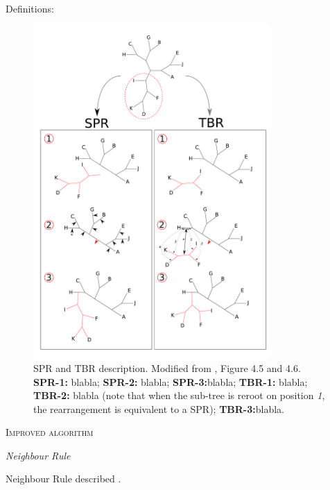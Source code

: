 \documentclass[12pt,letterpaper]{article}
\renewcommand{\section}[1]{%
\bigskip
\begin{center}
\begin{Large}
\normalfont\scshape #1
\medskip
\end{Large}
\end{center}}
\renewcommand{\subsection}[1]{%
\bigskip
\begin{center}
\begin{large}
\normalfont\itshape #1
\end{large}
\end{center}}
\begin{document}
Definitions: \cite{allen2001subtree,felsenstein2004inferring}


\begin{figure}[!htbp]
\centering
   \includegraphics[width=0.8\textwidth]{Figure/FelsensteinFigure.pdf}
\caption{\scriptsize{SPR and TBR description. Modified from \cite{felsenstein2004inferring}, Figure 4.5 and 4.6. \textbf{SPR-1:} blabla; \textbf{SPR-2:} blabla; \textbf{SPR-3:}blabla; \textbf{TBR-1:} blabla; \textbf{TBR-2:} blabla (note that when the sub-tree is reroot on position \textit{1}, the rearrangement is equivalent to a SPR); \textbf{TBR-3:}blabla.}}
\label{Figure_Felsenstein}
\end{figure}


\section{Improved algorithm}

\subsection{Neighbour Rule}
Neighbour Rule described \citep[in other words;][]{allen2001subtree}.
\end{document}
